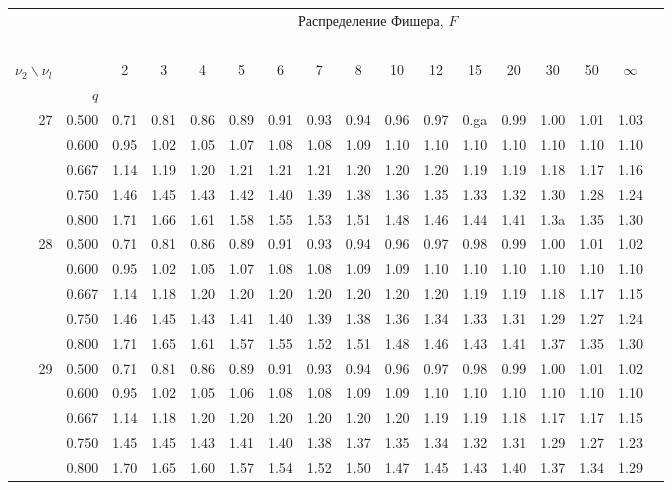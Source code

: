 \documentclass[pdftex,11pt,openany]{book}\usepackage[]{graphicx}\usepackage[]{color}
\begin{document}
{\begin{center}
\begin{tabular}{rrr@{\,}r@{\,}r@{\,}r@{\,}r@{\,}r@{\,}r@{\,}r
                   @{\,}r@{\,}r@{\,}r@{\,}r@{\,}r@{\,}r@{\,}r}
&&\multicolumn{14}{c}{Распределение Фишера, $F$}\\
\ \\
$\nu_2\backslash\nu_l$ & & 
\multicolumn{1}{c}{2} &\multicolumn{1}{c}{3} &
\multicolumn{1}{c}{4} &\multicolumn{1}{c}{5} &
\multicolumn{1}{c}{6} &\multicolumn{1}{c}{7} &
\multicolumn{1}{c}{8} &\multicolumn{1}{c}{10}&
\multicolumn{1}{c}{12}&\multicolumn{1}{c}{15}&
\multicolumn{1}{c}{20}&\multicolumn{1}{c}{30}&
\multicolumn{1}{c}{50}&\multicolumn{1}{c}{$\infty$}\\
& $q$ \\
27&0.500&0.71&0.81&0.86&0.89&0.91&0.93&0.94&0.96&0.97&0.ga&0.99&1.00&1.01&1.03\\
  &0.600&0.95&1.02&1.05&1.07&1.08&1.08&1.09&1.10&1.10&1.10&1.10&1.10&1.10&1.10\\
  &0.667&1.14&1.19&1.20&1.21&1.21&1.21&1.20&1.20&1.20&1.19&1.19&1.18&1.17&1.16\\
  &0.750&1.46&1.45&1.43&1.42&1.40&1.39&1.38&1.36&1.35&1.33&1.32&1.30&1.28&1.24\\
  &0.800&1.71&1.66&1.61&1.58&1.55&1.53&1.51&1.48&1.46&1.44&1.41&1.3a&1.35&1.30\\
28&0.500&0.71&0.81&0.86&0.89&0.91&0.93&0.94&0.96&0.97&0.98&0.99&1.00&1.01&1.02\\
  &0.600&0.95&1.02&1.05&1.07&1.08&1.08&1.09&1.09&1.10&1.10&1.10&1.10&1.10&1.10\\
  &0.667&1.14&1.18&1.20&1.20&1.20&1.20&1.20&1.20&1.20&1.19&1.19&1.18&1.17&1.15\\
  &0.750&1.46&1.45&1.43&1.41&1.40&1.39&1.38&1.36&1.34&1.33&1.31&1.29&1.27&1.24\\
  &0.800&1.71&1.65&1.61&1.57&1.55&1.52&1.51&1.48&1.46&1.43&1.41&1.37&1.35&1.30\\
29&0.500&0.71&0.81&0.86&0.89&0.91&0.93&0.94&0.96&0.97&0.98&0.99&1.00&1.01&1.02\\
  &0.600&0.95&1.02&1.05&1.06&1.08&1.08&1.09&1.09&1.10&1.10&1.10&1.10&1.10&1.10\\
  &0.667&1.14&1.18&1.20&1.20&1.20&1.20&1.20&1.20&1.19&1.19&1.18&1.17&1.17&1.15\\
  &0.750&1.45&1.45&1.43&1.41&1.40&1.38&1.37&1.35&1.34&1.32&1.31&1.29&1.27&1.23\\
  &0.800&1.70&1.65&1.60&1.57&1.54&1.52&1.50&1.47&1.45&1.43&1.40&1.37&1.34&1.29\\

\end{tabular}
\end{center}}
\end{document}
